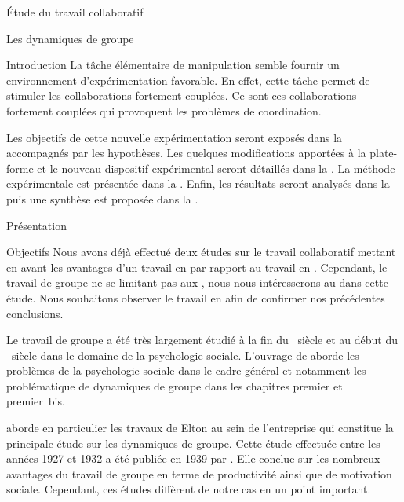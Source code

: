 \documentclass[myfrancais]{mythesis}
\begin{document}
\begin{mypart}{Étude du travail collaboratif}
\begin{mychapter}{Les dynamiques de groupe}
\begin{mysection}{Introduction}
				La tâche élémentaire de manipulation semble fournir un environnement d'expérimentation favorable.
				En effet, cette tâche permet de stimuler les collaborations fortement couplées.
				Ce sont ces collaborations fortement couplées qui provoquent les problèmes de coordination.

				Les objectifs de cette nouvelle expérimentation seront exposés dans la  accompagnés par les hypothèses.
				Les quelques modifications apportées à la plate-forme et le nouveau dispositif expérimental seront détaillés dans la .
				La méthode expérimentale est présentée dans la .
				Enfin, les résultats seront analysés dans la  puis une synthèse est proposée dans la .
			\end{mysection}
			\begin{mysection}{Présentation}
				\begin{mysubsection}{Objectifs}
					Nous avons déjà effectué deux études sur le travail collaboratif mettant en avant les avantages d'un travail en  par rapport au travail en .
					Cependant, le travail de groupe ne se limitant pas aux , nous nous intéresserons au  dans cette étude.
					Nous souhaitons observer le travail en  afin de confirmer nos précédentes conclusions.

					Le travail de groupe a été très largement étudié à la fin du ~siècle et au début du ~siècle dans le domaine de la psychologie sociale.
					L'ouvrage de  aborde les problèmes de la psychologie sociale dans le cadre général et notamment les problématique de dynamiques de groupe dans les chapitres premier et premier~bis.

					 aborde en particulier les travaux de Elton  au sein de l'entreprise \myHawthorne qui constitue la principale étude sur les dynamiques de groupe.
					Cette étude effectuée entre les années 1927 et 1932 a été publiée en 1939 par .
					Elle conclue sur les nombreux avantages du travail de groupe en terme de productivité ainsi que de motivation sociale.
					Cependant, ces études diffèrent de notre cas en un point important.


\end{mysubsection}
\end{mysection}
\end{mychapter}
\end{mypart}
\end{document}
